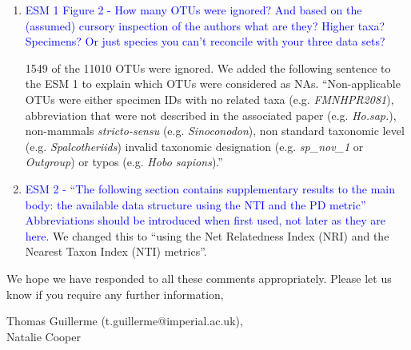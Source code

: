 \documentclass[12pt,letterpaper]{article}
\begin{document}
\begin{enumerate}
\item{\textcolor{blue}{ESM 1 Figure 2 - How many OTUs were ignored? And based on the (assumed) cursory inspection of the authors what are they? Higher taxa? Specimens? Or just species you can't reconcile with your three data sets?}}

1549 of the 11010 OTUs were ignored.
We added the following sentence to the ESM 1 to explain which OTUs were considered as NAs.
``Non-applicable OTUs were either specimen IDs with no related taxa (e.g. \textit{FMNHPR2081}), abbreviation that were not described in the associated paper (e.g. \textit{Ho.sap.}), non-mammals \textit{stricto-sensu} (e.g. \textit{Sinoconodon}), non standard taxonomic level (e.g. \textit{Spalcotheriids}) invalid taxonomic designation (e.g. \textit{sp\_nov\_1} or \textit{Outgroup}) or typos (e.g. \textit{Hobo sapions}).''

\item{\textcolor{blue}{ESM 2 - ``The following section contains supplementary results to the main body: the available data structure using the NTI and the PD metric'' Abbreviations should be introduced when first used, not later as they are here.}}
We changed this to ``using the Net Relatedness Index (NRI) and the Nearest Taxon Index (NTI) metrics''.

\end{enumerate}



We hope we have responded to all these comments appropriately. Please let us know if you require any further information,\\
\bigskip


Thomas Guillerme (t.guillerme@imperial.ac.uk),\\
Natalie Cooper
\end{document}
